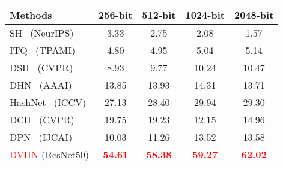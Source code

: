   \begin{table}[!htpb]
    \centering
    \begin{tabular}{cccccc}
       \\ \hline
    \multicolumn{2}{l|}{Methods} & 256-bit & 512-bit & 1024-bit & 2048-bit   \\\hline
    \multicolumn{2}{l|}{SH~\cite{weiss2008spectral} (NeurIPS)} & 3.33 & 2.75  & 2.08 &  1.57 \\  
    \multicolumn{2}{l|}{ITQ~\cite{gong2012iterative} (TPAMI)} & 4.80 & 4.95 & 5.04 & 5.14 \\  
    \hline
    \hline
    \multicolumn{2}{l|}{DSH~\cite{liu2016deep} (CVPR)} & 8.93 & 9.77 & 10.24 &  10.47 \\
    \multicolumn{2}{l|}{DHN~\cite{zhu2016deep} (AAAI)} & 13.85 & 13.93 & 14.31 & 13.71 \\
    \multicolumn{2}{l|}{HashNet~\cite{cao2017hashnet} (ICCV)} & 27.13 & 28.40 & 29.94 & 29.30  \\
    \multicolumn{2}{l|}{DCH~\cite{cao2018deep} (CVPR)} & 19.75 & 19.23 & 12.15 & 14.96  \\
    \multicolumn{2}{l|}{DPN~\cite{fan2020deep} (IJCAI)} & 10.03 & 11.26 & 13.52 & 13.58  \\
    \hline
    \hline
     \multicolumn{2}{l|}{\textcolor{red}{DVHN} (ResNet50) }&\textcolor{red}{\textbf{54.61}} & \textcolor{red}{\textbf{58.38}} & \textcolor{red}{\textbf{59.27}} & \textcolor{red}{\textbf{62.02}} \\
     \hline
     \hline
    \end{tabular}
    \label{table:veri}
  \end{table}

